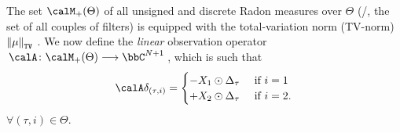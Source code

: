 \mynewline
The set $\posDisRadonMeasure$ of all unsigned and discrete Radon measures over $\Theta$ (\ie/, the set of all couples of  filters) is equipped with the total-variation norm (TV-norm) $\normTV{\mu}$
.
We now define the \emph{linear} observation operator $\kfuncdef{\opObs}{\posDisRadonMeasure}{\bbC^{N+1}}$, which is such that
\begin{equation}
    \opObs\delta_{(\tau, i)}
    =
    \begin{cases}
        - \RecordedSignalDFT_1 \odot \paramVec{\tau}  &\text{ if } i=1 \\
        + \RecordedSignalDFT_2 \odot \paramVec{\tau}  &\text{ if } i=2.
    \end{cases}
\end{equation}
$\forall(\tau,i)\in\Theta$.

